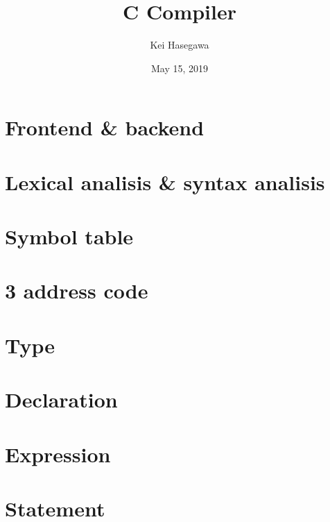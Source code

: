 \documentclass{report}
\begin{document}
\title{C Compiler}

\author{Kei Hasegawa}

\date{May 15, 2019}

\maketitle



\tableofcontents

\chapter{Frontend \& backend}



\chapter{Lexical analisis \& syntax analisis}



\chapter{Symbol table}



\chapter{3 address code}



\chapter{Type}



\chapter{Declaration}



\chapter{Expression}



\chapter{Statement}
\end{document}
